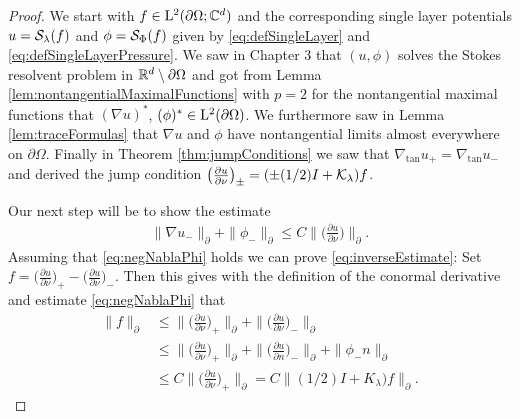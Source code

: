 \begin{proof}
  We start with $f \in \mathrm{L}^2(\partial\Omega; \mathbb{C}^d)$ and the corresponding single layer potentials $u = \mathcal{S}_\lambda(f)$ and $\phi = \mathcal{S}_\Phi(f)$ given by \eqref{eq:defSingleLayer} and \eqref{eq:defSingleLayerPressure}.
  We saw in Chapter 3 that $(u,\phi)$ solves the Stokes resolvent problem in $\mathbb{R}^d \setminus \partial\Omega$ and got from Lemma \ref{lem:nontangentialMaximalFunctions} with $p = 2$ for the nontangential maximal functions that $(\nabla u)^*$, $(\phi)^* \in \mathrm{L}^2(\partial\Omega)$.
  We furthermore saw in Lemma \ref{lem:traceFormulas} that $\nabla u$ and $\phi$ have nontangential limits almost everywhere on $\partial\Omega$. 
  Finally in Theorem \ref{thm:jumpConditions} we saw that $\nabla_{\mathrm{tan}} u_+ = \nabla_{\mathrm{tan}} u_-$ and derived the jump condition $\big(\frac{\partial u}{\partial \nu}\big)_\pm = (\pm (1/2) I + \mathcal{K}_\lambda) f$.

  Our next step will be to show the estimate
  \begin{align}
    \label{eq:negNablaPhi}
    \| \nabla u_- \|_\partial + \| \phi_- \|_\partial \leq C \| \big( \frac{\partial u}{\partial \nu} \big) \|_\partial .
  \end{align}
  Assuming that \eqref{eq:negNablaPhi} holds we can prove \eqref{eq:inverseEstimate}:
  Set $f = \big(\frac{\partial u}{\partial \nu} \big)_+ -  \big( \frac{\partial u}{\partial \nu} \big)_-$.
  Then this gives with the definition of the conormal derivative and estimate \eqref{eq:negNablaPhi} that
  \begin{align*}
    \| f\|_\partial 
    &\leq  \| \big( \frac{\partial u}{\partial \nu} \big)_+ \|_\partial + \| \big( \frac{\partial u}{\partial \nu} \big)_- \|_\partial  \\
    &\leq \| \big( \frac{\partial u}{\partial \nu} \big)_+  \|_\partial + \| \big( \frac{\partial u}{\partial n} \big)_- \|_\partial + \| \phi_- n \|_\partial  \\
    &\leq C \| \big( \frac{\partial u}{\partial \nu} \big)_+ \|_\partial
    = C \| (1/2)I + K_\lambda) f\|_\partial.
  \end{align*}


\end{proof}

